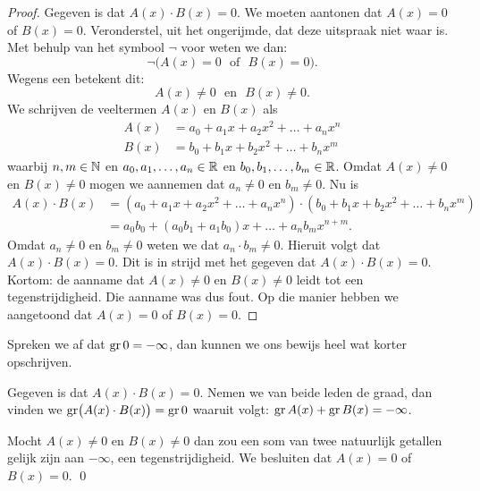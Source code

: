 \documentclass{ximera}
\begin{document}
\begin{proof}
Gegeven is dat $A(x)\cdot B(x) = 0$. We moeten aantonen dat $A(x) = 0$ of $B(x) = 0$. Veronderstel, uit het ongerijmde, dat deze uitspraak niet waar is. Met behulp van het symbool $\neg$ voor 
 weten we dan:
\[
\neg\bigl(A(x) = 0 \,\, \text{ of } \,\, B(x) = 0\bigr).
\]
Wegens een  betekent dit:
\[
A(x) \neq 0 \,\, \text{ en } \,\, B(x) \neq 0.
\] 
We schrijven de veeltermen $A(x)$ en $B(x)$ als
\begin{align*}
A(x) & = a_0 + a_1 x + a_2 x^2 + \dots + a_n x^n \\
B(x) & = b_0 + b_1 x + b_2 x^2 + \dots + b_n x^m
\end{align*}
waarbij $n,m \in \mathbb{N}$ en $a_0, a_1, \ldots, a_n \in \mathbb{R}$ en $b_0, b_1, \ldots, b_m \in \mathbb{R}$. Omdat $A(x) \neq 0$ en $B(x) \neq 0$ mogen we aannemen dat $a_n \neq 0$ en $b_m \neq 0$. Nu is
\begin{align*}
A(x) \cdot B(x) 
& = \left(a_0 + a_1 x + a_2 x^2 + \dots + a_n x^n\right) \cdot \left( b_0 + b_1 x + b_2 x^2 + \dots + b_n x^m\right) \\
& = a_0b_0 + (a_0b_1 + a_1b_0)x + \dots + a_n b_m x^{n+m}.
\end{align*}
Omdat $a_n \neq 0$ en $b_m \neq 0$ weten we dat $a_n \cdot b_m \neq 0$. Hieruit volgt dat $A(x) \cdot B(x) = 0$. Dit is in strijd met het gegeven dat $A(x)\cdot B(x) = 0$. Kortom: de aanname dat $A(x) \neq 0$ en $B(x) \neq 0$ leidt tot een tegenstrijdigheid. Die aanname was dus fout. Op die manier hebben we aangetoond dat $A(x) = 0$ of $B(x) = 0$. 
\end{proof}

Spreken we af dat $\operatorname{gr} 0 = - \infty$, dan kunnen we ons bewijs heel wat korter opschrijven. 

Gegeven is dat $A(x)\cdot B(x) = 0$. Nemen we van beide leden de graad, dan vinden we $\operatorname{gr}\bigl( A(x)\cdot B(x) \bigr) = \operatorname{gr} 0$ waaruit volgt: $\operatorname{gr} A(x) + \operatorname{gr} B(x) = - \infty$.

Mocht $A(x) \neq 0$ en $B(x) \neq 0$ dan zou een som van twee natuurlijk getallen gelijk zijn aan $-\infty$, een tegenstrijdigheid. We besluiten dat $A(x) = 0$ of $B(x) = 0$.
\qed


\end{document}
